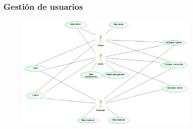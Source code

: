 \subsubsection{Gestión de usuarios}%
\begin{figure}[H]
    \centering
    \includegraphics[width = 0.8\textwidth]{Use_Cases/Gestion_Usuarios.png}
\end{figure}
\newpage
